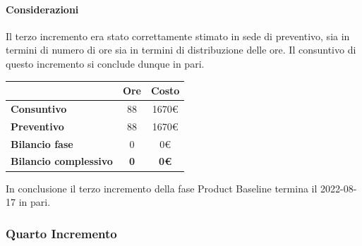 \paragraph{Considerazioni} \hfill \break
Il terzo incremento era stato correttamente stimato in sede di preventivo, sia in termini di numero di ore sia 
in termini di distribuzione delle ore. Il consuntivo di questo incremento si conclude dunque in pari.
\begin{center}
	\renewcommand{\arraystretch}{1.8}
	\begin{tabular}{ | l |c|c| }
    \hline
    & \textbf{Ore} & \textbf{Costo} \\
	\hline
    \textbf{Consuntivo} & 88 & 1670\euro \\
    \hline
    \textbf{Preventivo} & 88 & 1670\euro \\
    \hline
    \textbf{Bilancio fase} & 0 & 0\euro \\
    \hline
    \textbf{Bilancio complessivo} & \textbf{0} & \textbf{0\euro} \\
    \hline
    \end{tabular}
\end{center}
In conclusione il terzo incremento della fase Product Baseline termina il 2022-08-17 in pari.
\newpage

\subsubsection{Quarto Incremento}

